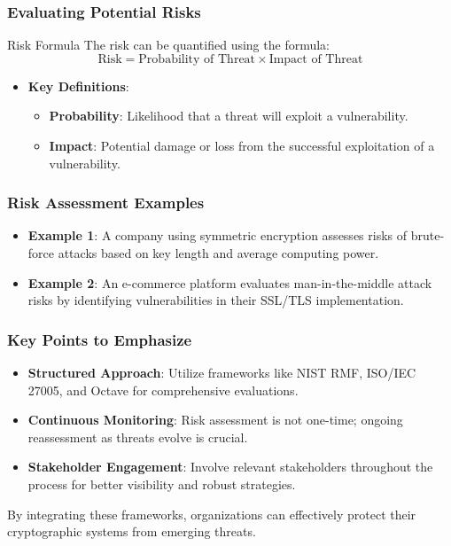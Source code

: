 \documentclass{beamer}
\begin{document}
\begin{frame}[fragile]
    \frametitle{Evaluating Potential Risks}
    \begin{block}{Risk Formula}
    The risk can be quantified using the formula:
    \[
    \text{Risk} = \text{Probability of Threat} \times \text{Impact of Threat}
    \]
    \end{block}
    
    \begin{itemize}
        \item \textbf{Key Definitions}:
        \begin{itemize}
            \item \textbf{Probability}: Likelihood that a threat will exploit a vulnerability.
            \item \textbf{Impact}: Potential damage or loss from the successful exploitation of a vulnerability.
        \end{itemize}
    \end{itemize}
\end{frame}

\begin{frame}[fragile]
    \frametitle{Risk Assessment Examples}
    \begin{itemize}
        \item \textbf{Example 1}: A company using symmetric encryption assesses risks of brute-force attacks based on key length and average computing power.
        
        \item \textbf{Example 2}: An e-commerce platform evaluates man-in-the-middle attack risks by identifying vulnerabilities in their SSL/TLS implementation.
    \end{itemize}
\end{frame}

\begin{frame}[fragile]
    \frametitle{Key Points to Emphasize}
    \begin{itemize}
        \item \textbf{Structured Approach}: Utilize frameworks like NIST RMF, ISO/IEC 27005, and Octave for comprehensive evaluations.
        
        \item \textbf{Continuous Monitoring}: Risk assessment is not one-time; ongoing reassessment as threats evolve is crucial.
        
        \item \textbf{Stakeholder Engagement}: Involve relevant stakeholders throughout the process for better visibility and robust strategies.
    \end{itemize}

    By integrating these frameworks, organizations can effectively protect their cryptographic systems from emerging threats.
\end{frame}
\end{document}
